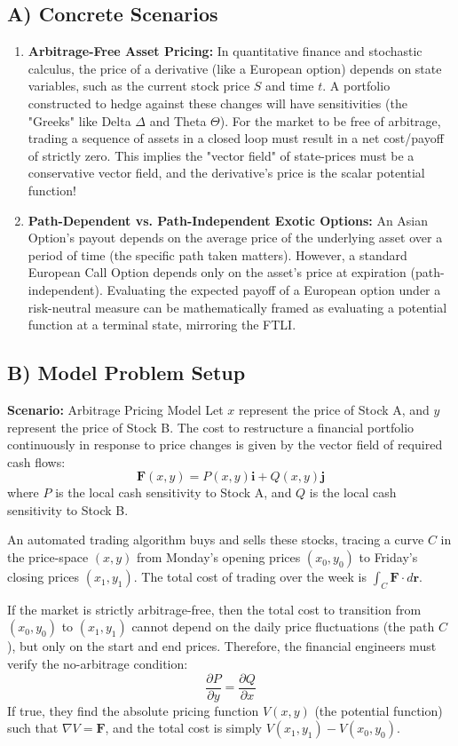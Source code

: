 \documentclass[12pt]{article}
\begin{document}
\subsection{A) Concrete Scenarios}
\begin{enumerate}
    \item \textbf{Arbitrage-Free Asset Pricing:} In quantitative finance and stochastic calculus, the price of a derivative (like a European option) depends on state variables, such as the current stock price $S$ and time $t$. A portfolio constructed to hedge against these changes will have sensitivities (the "Greeks" like Delta $\Delta$ and Theta $\Theta$). For the market to be free of arbitrage, trading a sequence of assets in a closed loop must result in a net cost/payoff of strictly zero. This implies the "vector field" of state-prices must be a conservative vector field, and the derivative's price is the scalar potential function!
    \item \textbf{Path-Dependent vs. Path-Independent Exotic Options:} An Asian Option's payout depends on the average price of the underlying asset over a period of time (the specific path taken matters). However, a standard European Call Option depends only on the asset's price at expiration (path-independent). Evaluating the expected payoff of a European option under a risk-neutral measure can be mathematically framed as evaluating a potential function at a terminal state, mirroring the FTLI.
\end{enumerate}

\subsection{B) Model Problem Setup}
\textbf{Scenario:} Arbitrage Pricing Model
Let $x$ represent the price of Stock A, and $y$ represent the price of Stock B. The cost to restructure a financial portfolio continuously in response to price changes is given by the vector field of required cash flows:
\[
\mathbf{F}(x, y) = P(x, y)\mathbf{i} + Q(x, y)\mathbf{j}
\]
where $P$ is the local cash sensitivity to Stock A, and $Q$ is the local cash sensitivity to Stock B.

An automated trading algorithm buys and sells these stocks, tracing a curve $C$ in the price-space $(x, y)$ from Monday's opening prices $(x_0, y_0)$ to Friday's closing prices $(x_1, y_1)$. The total cost of trading over the week is $\int_C \mathbf{F} \cdot d\mathbf{r}$. 

If the market is strictly arbitrage-free, then the total cost to transition from $(x_0, y_0)$ to $(x_1, y_1)$ cannot depend on the daily price fluctuations (the path $C$), but only on the start and end prices. Therefore, the financial engineers must verify the no-arbitrage condition:
\[
\frac{\partial P}{\partial y} = \frac{\partial Q}{\partial x}
\]
If true, they find the absolute pricing function $V(x, y)$ (the potential function) such that $\nabla V = \mathbf{F}$, and the total cost is simply $V(x_1, y_1) - V(x_0, y_0)$.
\end{document}
